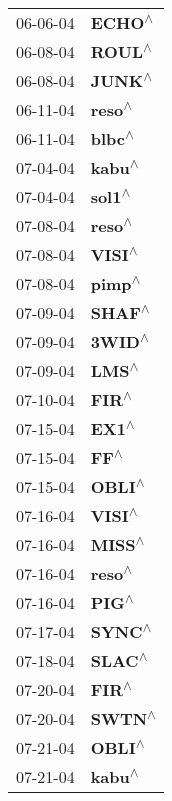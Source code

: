\begin{supertabular}{p{0.08\textwidth}p{0.2\textwidth}}
 06-06-04 &    \textbf{ECHO\textsuperscript{$\wedge$}} \\
 06-08-04 &    \textbf{ROUL\textsuperscript{$\wedge$}} \\
 06-08-04 &    \textbf{JUNK\textsuperscript{$\wedge$}} \\
 06-11-04 &    \textbf{reso\textsuperscript{$\wedge$}} \\
 06-11-04 &    \textbf{blbc\textsuperscript{$\wedge$}} \\
 07-04-04 &    \textbf{kabu\textsuperscript{$\wedge$}} \\
 07-04-04 &    \textbf{sol1\textsuperscript{$\wedge$}} \\
 07-08-04 &    \textbf{reso\textsuperscript{$\wedge$}} \\
 07-08-04 &    \textbf{VISI\textsuperscript{$\wedge$}} \\
 07-08-04 &    \textbf{pimp\textsuperscript{$\wedge$}} \\
 07-09-04 &    \textbf{SHAF\textsuperscript{$\wedge$}} \\
 07-09-04 &    \textbf{3WID\textsuperscript{$\wedge$}} \\
 07-09-04 &     \textbf{LMS\textsuperscript{$\wedge$}} \\
 07-10-04 &     \textbf{FIR\textsuperscript{$\wedge$}} \\
 07-15-04 &     \textbf{EX1\textsuperscript{$\wedge$}} \\
 07-15-04 &      \textbf{FF\textsuperscript{$\wedge$}} \\
 07-15-04 &    \textbf{OBLI\textsuperscript{$\wedge$}} \\
 07-16-04 &    \textbf{VISI\textsuperscript{$\wedge$}} \\
 07-16-04 &    \textbf{MISS\textsuperscript{$\wedge$}} \\
 07-16-04 &    \textbf{reso\textsuperscript{$\wedge$}} \\
 07-16-04 &     \textbf{PIG\textsuperscript{$\wedge$}} \\
 07-17-04 &    \textbf{SYNC\textsuperscript{$\wedge$}} \\
 07-18-04 &    \textbf{SLAC\textsuperscript{$\wedge$}} \\
 07-20-04 &     \textbf{FIR\textsuperscript{$\wedge$}} \\
 07-20-04 &    \textbf{SWTN\textsuperscript{$\wedge$}} \\
 07-21-04 &    \textbf{OBLI\textsuperscript{$\wedge$}} \\
 07-21-04 &    \textbf{kabu\textsuperscript{$\wedge$}} \\

\end{supertabular}
